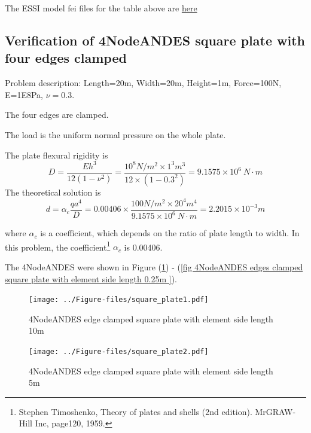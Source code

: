 \documentclass[fleqn,11pt]{article}
\begin{document}
The ESSI model fei files for the table above are \href{https://github.com/yuan-energy/ESSI_Verification/blob/master/4NodeANDES/clamped_beam_cut/clamped_beam_cut.tar.gz?raw=true}{here}







\newpage
\subsection{Verification of 4NodeANDES square plate with four edges clamped}

Problem description: Length=20m, Width=20m, Height=1m, Force=100N, E=1E8Pa, $\nu=0.3$. 

The four edges are clamped. 

The load is the uniform normal pressure on the whole plate. 


The plate flexural rigidity is 
\begin{equation}
  D=\frac{Eh^3}{12(1-\nu^2)}=\frac{10^8 N/m^2 \times 1^3 m^3 }{12 \times (1-0.3^2) }= 9.1575 \times 10^6 \ N\cdot m
\end{equation}
The theoretical solution is 
\begin{equation}
  d=\alpha_c \frac{q a^4}{D}=0.00406\times \frac{100 N/m^2 \times 20^4 m^4}{9.1575 \times 10^6 \ N\cdot m}=2.2015\times 10^{-3} m
\end{equation}

where $\alpha_c$ is a coefficient, which depends on the ratio of plate length to width. In this problem, the coefficient\footnote{Stephen Timoshenko, Theory of plates and shells (2nd edition). MrGRAW-Hill Inc, page120, 1959.} $\alpha_c$ is 0.00406.



The 4NodeANDES were shown in Figure (\ref{fig 4NodeANDES edges clamped square plate with element side length 10m }) - (\ref{fig 4NodeANDES edges clamped square plate with element side length 0.25m }). 


\begin{figure}[H]
  \centering
  \texttt{[image: ../Figure-files/square\_plate1.pdf]}
  \caption{4NodeANDES edge clamped square plate with element side length 10m }
  \label{fig 4NodeANDES edges clamped square plate with element side length 10m }
\end{figure}

\newpage

\begin{figure}[H]
  \centering
  \texttt{[image: ../Figure-files/square\_plate2.pdf]}
  \caption{4NodeANDES edge clamped square plate with element side length 5m }
  \label{fig 4NodeANDES edges clamped square plate with element side length 5m }
\end{figure}
\end{document}
